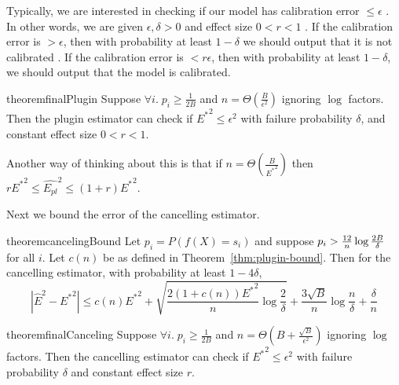 Typically, we are interested in checking if our model has calibration error $\leq \epsilon$ .  In other words, we are given $\epsilon, \delta > 0$ and effect size $0 < r < 1$ . If the calibration error is $> \epsilon$, then with probability at least $1 - \delta$ we should output that it is not calibrated . If the calibration error is $< r\epsilon$, then with probability at least $1 - \delta$, we should output that the model is calibrated.

\begin{restatable}{theorem}{finalPlugin}
\label{thm:final-plugin}
  Suppose  $\forall i.\;p_i \geq \frac{1}{2B}$ and $n = \Theta(\frac{B}{\epsilon^2})$ ignoring $\log$ factors. Then the plugin estimator can check if ${E^*}^2 \leq \epsilon^2$ with failure probability $\delta$, and constant effect size $0 < r < 1$. 
\end{restatable}

Another way of thinking about this is that if $n = \Theta(\frac{B}{{E^*}^2})$ then  $r {E^*}^2 \leq \hat{E_{pl}}^2 \leq (1+r){E^*}^2$.

Next we bound the error of the cancelling estimator.


\begin{restatable}{theorem}{cancelingBound}
\label{thm:our-bound}
Let $p_i = P(f(X) = s_i)$ and suppose $p_i > \frac{12}{n}\log{\frac{2B}{\delta}}{}$ for all $i$. Let $c(n)$ be as defined in Theorem~\ref{thm:plugin-bound}.
Then for the cancelling estimator, with probability at least $1 - 4\delta$,
\[ | \hat{E}^2 - {E^*}^2 | \leq c(n){E^*}^2 + \sqrt{\frac{2(1+c(n)){E^*}^2}{n} \log{\frac{2}{\delta}}} + \frac{3\sqrt{B}}{n} \log{\frac{n}{\delta}} + \frac{\delta}{n}\]
\end{restatable}

\begin{restatable}{theorem}{finalCanceling}
\label{thm:final-ours}
Suppose $\forall i.\;p_i \geq \frac{1}{2B}$ and $n = \Theta(B+\frac{\sqrt{B}}{\epsilon^2})$ ignoring $\log$ factors. Then the cancelling estimator can check if ${E^*}^2 \leq \epsilon^2$ with failure probability $\delta$ and constant effect size $r$. 
\end{restatable}


